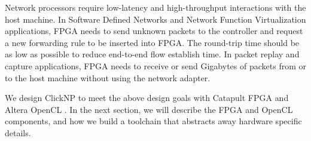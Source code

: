 Network processors require low-latency and high-throughput interactions with the host machine. In Software Defined Networks and Network Function Virtualization applications, FPGA needs to send unknown packets to the controller and request a new forwarding rule to be inserted into FPGA. The round-trip time should be as low as possible to reduce end-to-end flow establish time. In packet replay and capture applications, FPGA needs to receive or send Gigabytes of packets from or to the host machine without using the network adapter.

We design ClickNP to meet the above design goals with Catapult FPGA \cite{putnam2014reconfigurable} and Altera OpenCL \cite{singh2011implementing}. In the next section, we will describe the FPGA and OpenCL components, and how we build a toolchain that abstracts away hardware specific details.

